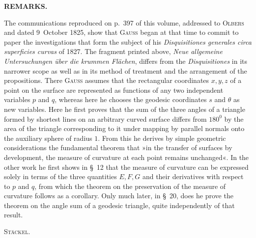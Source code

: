 %
\par{}\begin{center}\textbf{REMARKS.}\end{center}
\noindent\hspace*{1.2em}The communications reproduced on p.\ 397 of this volume, addressed to \textsc{Olbers} and dated 9\ October 1825, show that \textsc{Gauss} began at that time to commit to paper the investigations that form the subject of his \textit{Disquisitiones generales circa superficies curvas} of 1827. The fragment printed above, \textit{Neue allgemeine Untersuchungen über die krummen Flächen}, differs from the \textit{Disquisitiones} in its narrower scope as well as in its method of treatment and the arrangement of the propositions. There \textsc{Gauss} assumes that the rectangular coordinates $x,y,z$ of a point on the surface are represented as functions of any two independent variables $p$ and $q$, whereas here he chooses the geodesic coordinates $s$ and $\theta$ as new variables. Here he first proves that the sum of the three angles of a triangle formed by shortest lines on an arbitrary curved surface differs from $180^{0}$ by the area of the triangle corresponding to it under mapping by parallel normals onto the auxiliary sphere of radius $1$. From this he derives by simple geometric considerations the fundamental theorem that »in the transfer of surfaces by development, the measure of curvature at each point remains unchanged«. In the other work he first shows in \S\ 12 that the measure of curvature can be expressed solely in terms of the three quantities $E,F,G$ and their derivatives with respect to $p$ and $q$, from which the theorem on the preservation of the measure of curvature follows as a corollary. Only much later, in \S\ 20, does he prove the theorem on the angle sum of a geodesic triangle, quite independently of that result.
\begin{flushright}\textsc{Stäckel}.\end{flushright}
